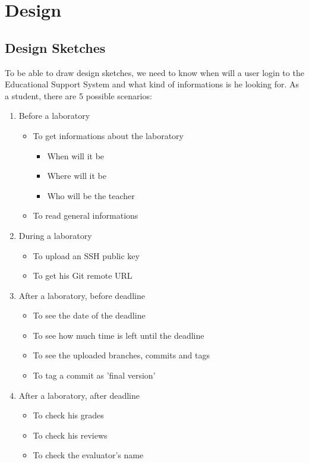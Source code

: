 \chapter{Design}

\section{Design Sketches}
To be able to draw design sketches, we need to know when will a user login to the Educational Support System and what kind of informations is he looking for. As a student, there are 5 possible scenarios:

\begin{enumerate}
	\item Before a laboratory
	\begin{itemize}
		\item To get informations about the laboratory
		\begin{itemize}
			\item When will it be
			\item Where will it be
			\item Who will be the teacher
		\end{itemize}
		\item To read general informations
	\end{itemize}
	
	\item During a laboratory
	\begin{itemize}
		\item To upload an SSH public key
		\item To get his Git remote URL
	\end{itemize}
	
	\item After a laboratory, before deadline
	\begin{itemize}
		\item To see the date of the deadline
		\item To see how much time is left until the deadline
		\item To see the uploaded branches, commits and tags
		\item To tag a commit as 'final version'
	\end{itemize}
	
	\item After a laboratory, after deadline
	\begin{itemize}
		\item To check his grades
		\item To check his reviews
		\item To check the evaluator's name
	\end{itemize}
	

\end{enumerate}
